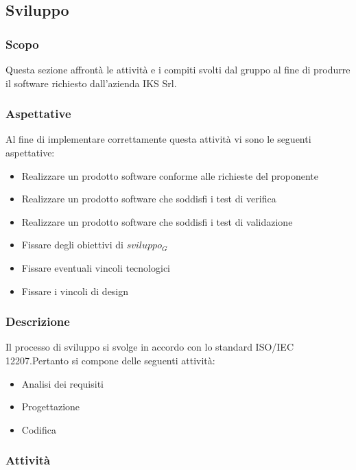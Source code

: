 \subsection{Sviluppo}
	\subsubsection{Scopo}
	Questa sezione affrontà le attività e i compiti svolti dal gruppo al fine di produrre il software richiesto dall'azienda IKS Srl.
	
	\subsubsection{Aspettative}
	Al fine di implementare correttamente questa attività vi sono le seguenti aspettative:
	\begin{itemize}
		\item Realizzare un prodotto software conforme alle richieste del proponente
		\item Realizzare un prodotto software che soddisfi i test di verifica
		\item Realizzare un prodotto software che soddisfi i test di validazione
		\item Fissare degli obiettivi di $sviluppo_G$
		\item Fissare eventuali vincoli tecnologici
		\item Fissare i vincoli di design
	\end{itemize}
	
	\subsubsection{Descrizione}
	Il processo di sviluppo si svolge in accordo con lo standard ISO/IEC 12207.Pertanto si compone delle seguenti attività:
	\begin{itemize}
		\item Analisi dei requisiti
		\item Progettazione
		\item Codifica
	\end{itemize}
	
	\subsubsection{Attività}

